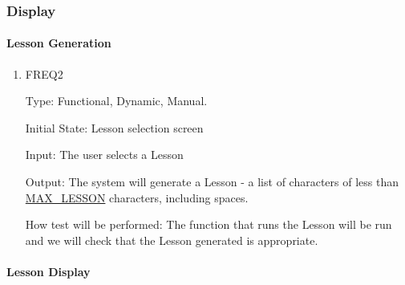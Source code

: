 \documentclass[12pt, titlepage]{article}
\begin{document}
\subsubsection{Display}
\paragraph{Lesson Generation}

\begin{enumerate}

\item{FREQ2\\}

Type: Functional, Dynamic, Manual.
					
Initial State: Lesson selection screen
					
Input: The user selects a Lesson
					
Output: The system will generate a Lesson - a list of characters of less than \hyperref[symbols]{MAX\_LESSON} characters, including spaces.
					
How test will be performed: The function that runs the Lesson will be run and we will check that the Lesson generated is appropriate. 

\end{enumerate}

\paragraph{Lesson Display}
\end{document}
